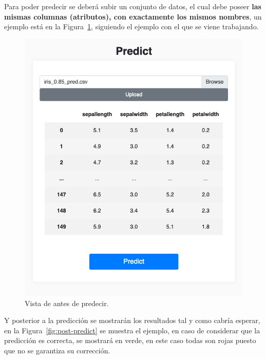 Para poder predecir se deberá subir un conjunto de datos, el cual debe poseer \textbf{las mismas columnas (atributos), con exactamente los mismos nombres}, un ejemplo está en la Figura~\ref{fig:pre-predict}, siguiendo el ejemplo con el que se viene trabajando.

\begin{figure}
\centering
\includegraphics[scale=0.4]{../img/anexos/manual-usuario/UBUMLaaS/pre-predict}
\caption{Vista de antes de predecir.}\label{fig:pre-predict}
\end{figure}

Y posterior a la predicción se mostrarán los resultados tal y como cabría esperar, en la Figura~\ref{fig:post-predict} se muestra el ejemplo, en caso de considerar que la predicción es correcta, se mostrará en verde, en este caso todas son rojas puesto que no se garantiza su corrección.

